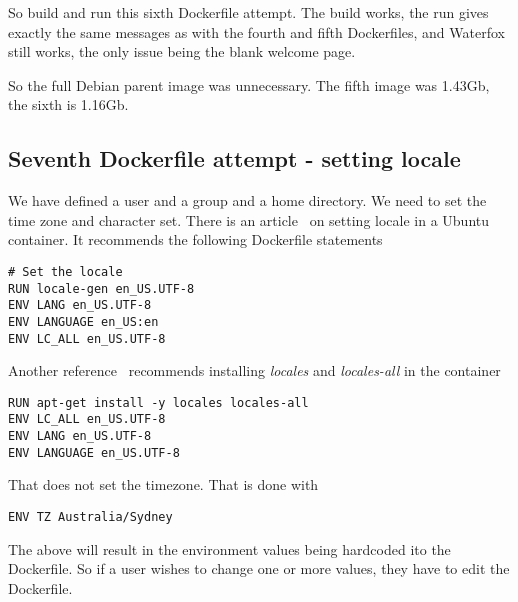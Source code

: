 \documentclass{article}  %
\begin{document}
So build and run this sixth Dockerfile attempt. The build works, the run gives exactly the same messages as with the fourth and fifth Dockerfiles, and Waterfox still works, the only issue being the blank welcome page.

So the full Debian parent image was unnecessary. The fifth image was 1.43Gb, the sixth is 1.16Gb. 

\subsection{Seventh Dockerfile attempt - setting locale}
We  have defined a user and a group and a home directory. We need to set the time zone and character set. There is an article~\cite{dock:11} on setting locale in a Ubuntu container. It recommends the following Dockerfile statements
\begin{verbatim}
# Set the locale
RUN locale-gen en_US.UTF-8  
ENV LANG en_US.UTF-8  
ENV LANGUAGE en_US:en  
ENV LC_ALL en_US.UTF-8  
\end{verbatim}
Another reference~\cite{dock:12} recommends installing {\em locales} and {\em locales-all} in the container
\begin{verbatim}
RUN apt-get install -y locales locales-all
ENV LC_ALL en_US.UTF-8
ENV LANG en_US.UTF-8
ENV LANGUAGE en_US.UTF-8
\end{verbatim}
That does not set the timezone. That is done with 
\begin{verbatim}
ENV TZ Australia/Sydney
\end{verbatim}
The above will result in the environment values being hardcoded ito the Dockerfile. So if a user wishes to change one or more values, they have to edit the Dockerfile.
\end{document}
